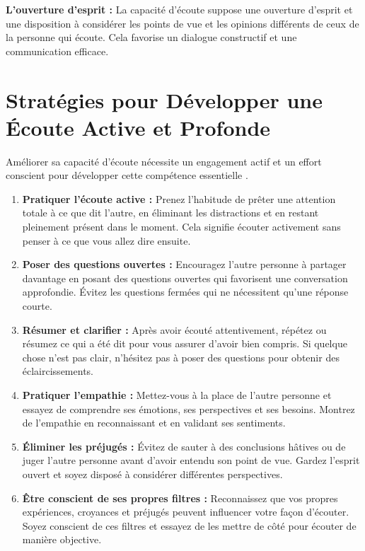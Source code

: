 \documentclass[a4paper, 11pt, oneside]{book}
\begin{document}
\textbf{L'ouverture d'esprit :} La capacité d'écoute suppose une ouverture d'esprit et une disposition à considérer les points de vue et les opinions différents de ceux de la personne qui écoute. Cela favorise un dialogue constructif et une communication efficace.

\section{Stratégies pour Développer une Écoute Active et Profonde}
Améliorer sa capacité d'écoute nécessite un engagement actif et un effort conscient pour développer cette compétence essentielle \cite{agendrix}. 

\begin{enumerate}
    \item \textbf{Pratiquer l'écoute active :} Prenez l'habitude de prêter une attention totale à ce que dit l'autre, en éliminant les distractions et en restant pleinement présent dans le moment. Cela signifie écouter activement sans penser à ce que vous allez dire ensuite.
   
    \item \textbf{Poser des questions ouvertes :} Encouragez l'autre personne à partager davantage en posant des questions ouvertes qui favorisent une conversation approfondie. Évitez les questions fermées qui ne nécessitent qu'une réponse courte.
    
    \item \textbf{Résumer et clarifier :} Après avoir écouté attentivement, répétez ou résumez ce qui a été dit pour vous assurer d'avoir bien compris. Si quelque chose n'est pas clair, n'hésitez pas à poser des questions pour obtenir des éclaircissements.
   
    \item \textbf{Pratiquer l'empathie :} Mettez-vous à la place de l'autre personne et essayez de comprendre ses émotions, ses perspectives et ses besoins. Montrez de l'empathie en reconnaissant et en validant ses sentiments.
   
    \item \textbf{Éliminer les préjugés :} Évitez de sauter à des conclusions hâtives ou de juger l'autre personne avant d'avoir entendu son point de vue. Gardez l'esprit ouvert et soyez disposé à considérer différentes perspectives.
     
    \item \textbf{Être conscient de ses propres filtres :} Reconnaissez que vos propres expériences, croyances et préjugés peuvent influencer votre façon d'écouter. Soyez conscient de ces filtres et essayez de les mettre de côté pour écouter de manière objective.
     

\end{enumerate}
\end{document}
